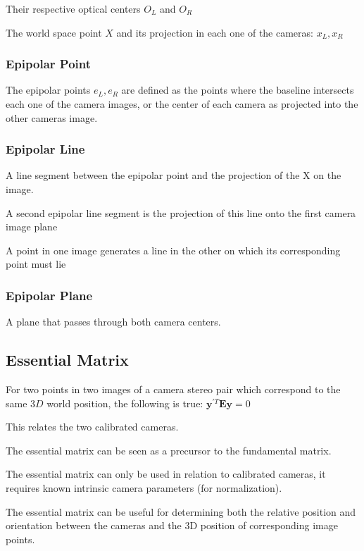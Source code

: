 Their respective optical centers $O_L$ and $O_R$

The world space point $X$ and its projection in each one of the cameras: $x_L, x_R$

\subsubsection{Epipolar Point}

The epipolar points $e_L, e_R$ are defined as the points where the baseline intersects each one of the camera images, or the center of each camera as projected into the other cameras image.

\subsubsection{Epipolar Line}

A line segment between the epipolar point and the projection of the X on the image.

A second epipolar line segment is the projection of this line onto the first camera image plane

A point in one image generates a line in the other on which its corresponding point must lie

\subsubsection{Epipolar Plane}

A plane that passes through both camera centers.

\subsection{Essential Matrix}

For two points in two images of a camera stereo pair which correspond to the same $3D$ world position, the following is true: 
$\mathbf{y}^{\prime T}\mathbf{Ey}=0$

This relates the two calibrated cameras.

The essential matrix can be seen as a precursor to the fundamental matrix. 

The essential matrix can only be used in relation to calibrated cameras, it requires known intrinsic camera parameters (for normalization).

The essential matrix can be useful for determining both the relative position and orientation between the cameras and the 3D position of corresponding image points.

